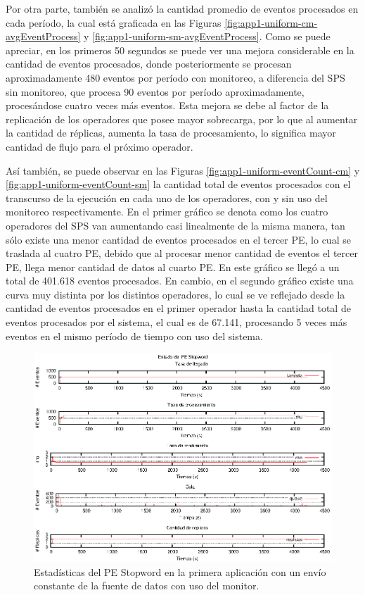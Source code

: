 Por otra parte, también se analizó la cantidad promedio de eventos procesados en cada período, la cual está graficada en las Figuras \ref{fig:app1-uniform-cm-avgEventProcess} y \ref{fig:app1-uniform-sm-avgEventProcess}. Como se puede apreciar, en los primeros 50 segundos se puede ver una mejora considerable en la cantidad de eventos procesados, donde posteriormente se procesan aproximadamente 480 eventos por período con monitoreo, a diferencia del SPS sin monitoreo, que procesa 90 eventos por período aproximadamente, procesándose cuatro veces más eventos. Esta mejora se debe al factor de la replicación de los operadores que posee mayor sobrecarga, por lo que al aumentar la cantidad de réplicas, aumenta la tasa de procesamiento, lo significa mayor cantidad de flujo para el próximo operador.

Así también, se puede observar en las Figuras \ref{fig:app1-uniform-eventCount-cm} y \ref{fig:app1-uniform-eventCount-sm} la cantidad total de eventos procesados con el transcurso de la ejecución en cada uno de los operadores, con y sin uso del monitoreo respectivamente. En el primer gráfico se denota como los cuatro operadores del SPS van aumentando casi linealmente de la misma manera, tan sólo existe una menor cantidad de eventos procesados en el tercer PE, lo cual se traslada al cuatro PE, debido que al procesar menor cantidad de eventos el tercer PE, llega menor cantidad de datos al cuarto PE. En este gráfico se llegó a un total de 401.618 eventos procesados. En cambio, en el segundo gráfico existe una curva muy distinta por los distintos operadores, lo cual se ve reflejado desde la cantidad de eventos procesados en el primer operador hasta la cantidad total de eventos procesados por el sistema, el cual es de 67.141, procesando 5 veces más eventos en el mismo período de tiempo con uso del sistema.

\begin{figure}[p]
\centering
    \includegraphics[scale=1.1]{images/exp/app1/uniform/cm/statusStopwordPE.eps}
    \caption{Estadísticas del PE Stopword en la primera aplicación con un envío constante de la fuente de datos con uso del monitor.}
    \label{fig:app1-uniform-statusStopwordPE-cm}
\end{figure}

